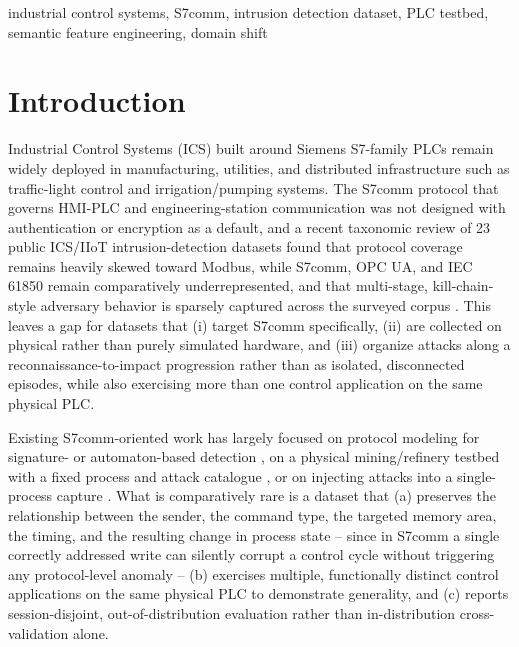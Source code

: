 \documentclass[conference]{IEEEtran}
\begin{document}
\begin{IEEEkeywords}
industrial control systems, S7comm, intrusion detection dataset, PLC testbed, semantic feature engineering, domain shift
\end{IEEEkeywords}

\section{Introduction}

Industrial Control Systems (ICS) built around Siemens S7-family PLCs remain widely deployed in manufacturing, utilities, and distributed infrastructure such as traffic-light control and irrigation/pumping systems. The S7comm protocol that governs HMI-PLC and engineering-station communication was not designed with authentication or encryption as a default, and a recent taxonomic review of 23 public ICS/IIoT intrusion-detection datasets found that protocol coverage remains heavily skewed toward Modbus, while S7comm, OPC UA, and IEC 61850 remain comparatively underrepresented, and that multi-stage, kill-chain-style adversary behavior is sparsely captured across the surveyed corpus \cite{termanini2026}. This leaves a gap for datasets that (i) target S7comm specifically, (ii) are collected on physical rather than purely simulated hardware, and (iii) organize attacks along a reconnaissance-to-impact progression rather than as isolated, disconnected episodes, while also exercising more than one control application on the same physical PLC.

Existing S7comm-oriented work has largely focused on protocol modeling for signature- or automaton-based detection \cite{kleinmann2014}, on a physical mining/refinery testbed with a fixed process and attack catalogue \cite{rodofile2017}, or on injecting attacks into a single-process capture \cite{alduwairi2025}. What is comparatively rare is a dataset that (a) preserves the relationship between the sender, the command type, the targeted memory area, the timing, and the resulting change in process state -- since in S7comm a single correctly addressed write can silently corrupt a control cycle without triggering any protocol-level anomaly -- (b) exercises multiple, functionally distinct control applications on the same physical PLC to demonstrate generality, and (c) reports session-disjoint, out-of-distribution evaluation rather than in-distribution cross-validation alone.
\end{document}
